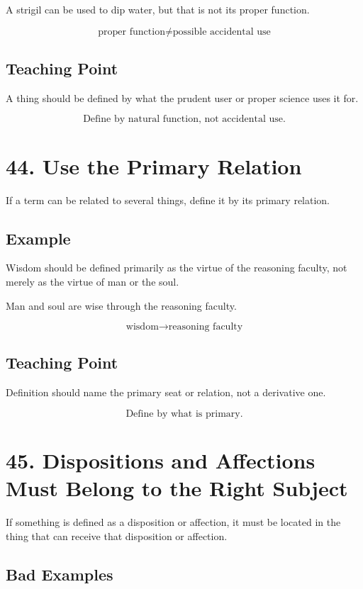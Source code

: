 \documentclass[12pt]{article}
\begin{document}
A strigil can be used to dip water, but that is not its proper function.

\[
\text{proper function} \neq \text{possible accidental use}
\]

\subsection*{Teaching Point}

A thing should be defined by what the prudent user or proper science uses it
for.

\[
\boxed{
\text{Define by natural function, not accidental use.}
}
\]

\section*{44. Use the Primary Relation}

If a term can be related to several things, define it by its primary relation.

\subsection*{Example}

Wisdom should be defined primarily as the virtue of the reasoning faculty, not
merely as the virtue of man or the soul.

Man and soul are wise through the reasoning faculty.

\[
\text{wisdom} \rightarrow \text{reasoning faculty}
\]

\subsection*{Teaching Point}

Definition should name the primary seat or relation, not a derivative one.

\[
\boxed{
\text{Define by what is primary.}
}
\]

\section*{45. Dispositions and Affections Must Belong to the Right Subject}

If something is defined as a disposition or affection, it must be located in the
thing that can receive that disposition or affection.

\subsection*{Bad Examples}
\end{document}
